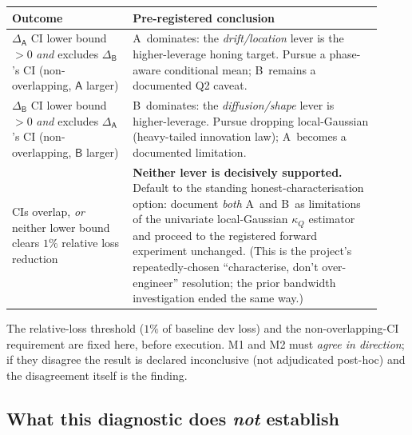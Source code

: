 \documentclass[11pt]{article}
\newcommand{\kQ}{\kappa_{Q}}
\newcommand{\defA}{\textsf{A}}
\newcommand{\defB}{\textsf{B}}
\begin{document}
\begin{center}
\begin{tabular}{@{}p{0.30\linewidth}p{0.62\linewidth}@{}}
\toprule
\textbf{Outcome} & \textbf{Pre-registered conclusion}\\
\midrule
$\Delta_\defA$ CI lower bound $>0$ \emph{and}
excludes $\Delta_\defB$'s CI (non-overlapping, $\defA$ larger)
 & \defA\ dominates: the \emph{drift/location} lever is the
   higher-leverage honing target. Pursue a phase-aware conditional mean;
   \defB\ remains a documented Q2 caveat. \\[4pt]
$\Delta_\defB$ CI lower bound $>0$ \emph{and}
excludes $\Delta_\defA$'s CI (non-overlapping, $\defB$ larger)
 & \defB\ dominates: the \emph{diffusion/shape} lever is higher-leverage.
   Pursue dropping local-Gaussian (heavy-tailed innovation law); \defA\
   becomes a documented limitation. \\[4pt]
CIs overlap, \emph{or} neither lower bound clears
$1\%$ relative loss reduction
 & \textbf{Neither lever is decisively supported.} Default to the
   standing honest-characterisation option: document \emph{both} \defA\
   and \defB\ as limitations of the univariate local-Gaussian $\kQ$
   estimator and proceed to the registered forward experiment unchanged.
   (This is the project's repeatedly-chosen ``characterise, don't
   over-engineer'' resolution; the prior bandwidth investigation
   ended the same way.) \\
\bottomrule
\end{tabular}
\end{center}

\noindent The relative-loss threshold ($1\%$ of baseline dev loss) and
the non-overlapping-CI requirement are fixed here, before execution. M1
and M2 must \emph{agree in direction}; if they disagree the result is
declared inconclusive (not adjudicated post-hoc) and the disagreement
itself is the finding.

\subsection{What this diagnostic does \emph{not} establish}
\end{document}

